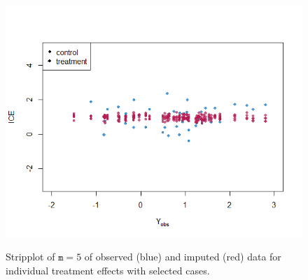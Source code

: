 \begin{figure}[ht!]
\begin{center}
{{					\includegraphics[scale=.5]{plots/plot4.8}
				}
			}
		\end{center}
		\caption{Stripplot of $\texttt{m} = 5$ of observed (blue) and imputed (red) data for individual treatment effects with selected cases.}
		\label{fig4_3}
	\end{figure}
